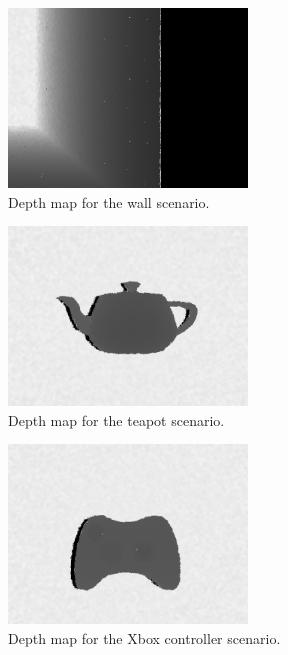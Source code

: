 \documentclass[journal]{IEEEtran}
\begin{document}
\begin{figure}[!t]
    \centering
    \includegraphics[width=2.5in]{imgs/Wall/depth.png}
    \caption{Depth map for the wall scenario.}
    \label{fig:wall_depth}
\end{figure}

\begin{figure}[!t]
    \centering
    \includegraphics[width=2.5in]{imgs/Teapod/depth.png}
    \caption{Depth map for the teapot scenario.}
    \label{fig:teapot_depth}
\end{figure}

\begin{figure}[!t]
    \centering
    \includegraphics[width=2.5in]{imgs/XboxController/depth.png}
    \caption{Depth map for the Xbox controller scenario.}
    \label{fig:xbox_depth}
\end{figure}
\end{document}

